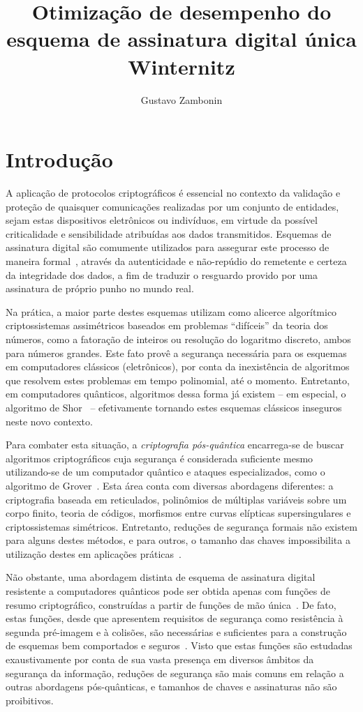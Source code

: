 \documentclass[12pt]{report}
\title{Otimização de desempenho do esquema de assinatura digital única Winternitz}
\author{Gustavo Zambonin}
\date{}
\begin{document}
\maketitle

\chapter{Introdução}

A aplicação de protocolos criptográficos é essencial no contexto da validação e
proteção de quaisquer comunicações realizadas por um conjunto de entidades,
sejam estas dispositivos eletrônicos ou indivíduos, em virtude da possível
criticalidade e sensibilidade atribuídas aos dados transmitidos. Esquemas de
assinatura digital são comumente utilizados para assegurar este processo de
maneira formal~\cite{Goldreich:2004:FCV:975541}, através da autenticidade e
não-repúdio do remetente e certeza da integridade dos dados, a fim de
traduzir o resguardo provido por uma assinatura de próprio punho no mundo real.

Na prática, a maior parte destes esquemas utilizam como alicerce algorítmico
criptossistemas assimétricos baseados em problemas ``difíceis'' da teoria
dos números, como a fatoração de inteiros ou resolução do logaritmo discreto,
ambos para números grandes. Este fato provê a segurança necessária para os
esquemas em computadores clássicos (eletrônicos), por conta da inexistência de
algoritmos que resolvem estes problemas em tempo polinomial, até o momento.
Entretanto, em computadores quânticos, algoritmos dessa forma já existem -- em
especial, o algoritmo de Shor~\cite{Shor:1997:PAP:264393.264406} -- efetivamente
tornando estes esquemas clássicos inseguros neste novo contexto.

Para combater esta situação, a \emph{criptografia pós-quântica} encarrega-se de buscar
algoritmos criptográficos cuja segurança é considerada suficiente mesmo
utilizando-se de um computador quântico e ataques especializados, como o
algoritmo de Grover~\cite{Grover:1996:FQM:237814.237866}. Esta área conta com
diversas abordagens diferentes: a criptografia baseada em reticulados,
polinômios de múltiplas variáveis sobre um corpo finito, teoria de códigos,
morfismos entre curvas elípticas supersingulares e criptossistemas simétricos.
Entretanto, reduções de segurança formais não existem para alguns destes
métodos, e para outros, o tamanho das chaves impossibilita a utilização destes
em aplicações práticas~\cite{Bernstein2017}.

Não obstante, uma abordagem distinta de esquema de assinatura digital
resistente a computadores quânticos pode ser obtida apenas com funções de
resumo criptográfico, construídas a partir de funções de mão
única~\cite{cryptoeprint:2005:328}. De fato, estas funções, desde que apresentem
requisitos de segurança como resistência à segunda pré-imagem e à colisões, são
necessárias e suficientes para a construção de esquemas bem comportados e
seguros~\cite{Rompel:1990:OFN:100216.100269}. Visto que estas funções são
estudadas exaustivamente por conta de sua vasta presença em diversos âmbitos da
segurança da informação, reduções de segurança são mais comuns em relação a
outras abordagens pós-quânticas, e tamanhos de chaves e assinaturas não são
proibitivos.
\end{document}
